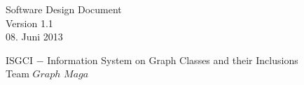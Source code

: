 \documentclass[10pt,a4paper]{article}
\begin{document}
\thispagestyle{empty} %
\begin{center}
\end{center}


\vspace*{1cm} 
\begin{center}
{\huge Software Design Document}\\
{\large Version 1.1}\\
{\large 08. Juni 2013}\\
\end{center}

\begin{center}
{\large ISGCI $-$ Information System on Graph Classes and their Inclusions}\\
{\large Team $Graph$ $Maga$}
\end{center}


\newpage


\tableofcontents
\newpage
\end{document}
